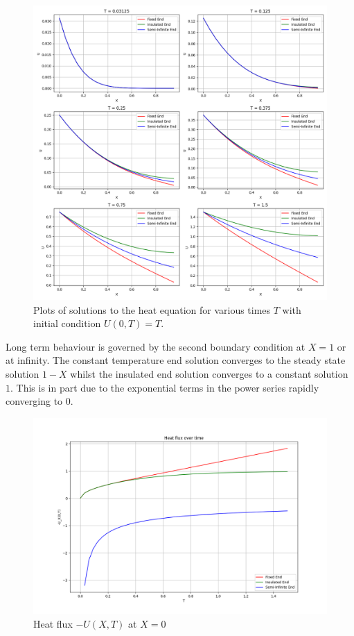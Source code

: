 \documentclass{article}
\begin{document}
\begin{figure}
    \centering
    \includegraphics[width=1.0\linewidth]{images/heat_equation_all_cases.png}
    \caption{Plots of solutions to the heat equation for various times \(T\) with initial condition \(U(0,T) = T\).}
\end{figure}

Long term behaviour is governed by the second boundary condition at \(X = 1\) or at infinity. The constant temperature end solution converges to the steady state solution \(1-X\) whilst the insulated end solution converges to a constant solution \(1\). This is in part due to the exponential terms in the power series rapidly converging to \(0\). 

\begin{figure}
    \centering
    \includegraphics[width=1.0\linewidth]{images/flux.png}
    \caption{Heat flux \(-U(X,T)\) at \(X = 0\)}
\end{figure}
\end{document}
